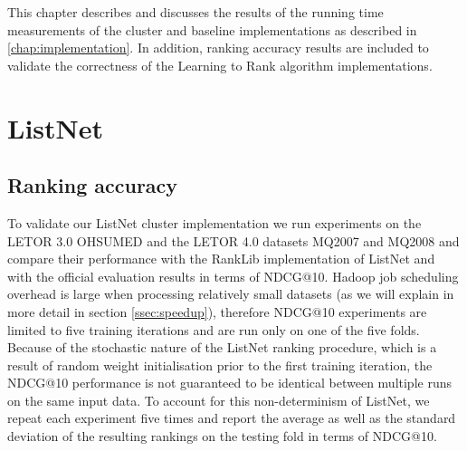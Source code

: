 This chapter describes and discusses the results of the running time measurements of the cluster and baseline implementations as described in \ref{chap:implementation}. In addition, ranking accuracy results are included to validate the correctness of the Learning to Rank algorithm implementations.
\section{ListNet}

\subsection{Ranking accuracy}
To validate our ListNet cluster implementation we run experiments on the LETOR 3.0 OHSUMED and the LETOR 4.0 datasets MQ2007 and MQ2008 and compare their performance with the RankLib implementation of ListNet and with the official evaluation results in terms of \ac{NDCG}@10. Hadoop job scheduling overhead is large when processing relatively small datasets (as we will explain in more detail in section \ref{ssec:speedup}), therefore \ac{NDCG}@10 experiments are limited to five training iterations and are run only on one of the five folds. Because of the stochastic nature of the ListNet ranking procedure, which is a result of random weight initialisation prior to the first training iteration, the \ac{NDCG}@10 performance is not guaranteed to be identical between multiple runs on the same input data. To account for this non-determinism of ListNet, we repeat each experiment five times and report the average as well as the standard deviation of the resulting rankings on the testing fold in terms of \ac{NDCG}@10.\\

